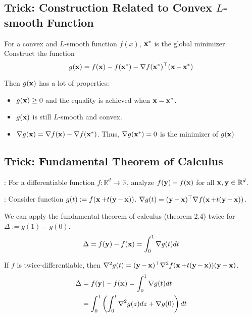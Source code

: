 \subsection*{Trick: Construction Related to Convex $L$-smooth Function}
For a convex and $L$-smooth function $f(x)$, $\x^*$ is the global minimizer. Construct the function
$$
g(\x) = f(\x) - f(\x^*) - \nabla f(\x^*)^\top(\x - \x^*)
$$

Then $g(\x)$ has a lot of properties:
\begin{itemize}[leftmargin=*]
    \item $g(\x) \geq 0$ and the equality is achieved when $\x = \x^*$.
    \item $g(\x)$ is still $L$-smooth and convex.
    \item $\nabla g(\x) = \nabla f(\x) - \nabla f(\x^*)$. Thus, $\nabla g(\x^*) = 0$ is the minimizer of $g(\x)$
\end{itemize}


\subsection*{Trick: Fundamental Theorem of Calculus}
: For a differentiable function $f: \mathbb{R}^d \rightarrow \mathbb{R}$, analyze $f(\y) - f(\x)$ for all $\x, \y \in \mathbb{R}^d$. 

: Consider function $g(t):=f(\x+t(\y-\x))$. $\nabla g(t)=(\y-\x)^{\top} \nabla f(\x+t(\y-\x))$.

We can apply the fundamental theorem of calculus (theorem 2.4) twice for $\Delta:=g(1)-g(0)$.
$$
\Delta =f(\y)-f(\x) =\int_{0}^{1} \nabla g(t) d t
$$

If $f$ is twice-differentiable, then $\nabla^{2} g(t)=(\y-\x)^{\top} \nabla^{2} f(\x+t(\y-\x))(\y-\x)$.
$$\begin{aligned} \Delta &=f(\y)-f(\x) =\int_{0}^{1} \nabla g(t) d t \\ &=\int_{0}^{1}\left(\int_{0}^{t} \nabla^{2} g(z) d z+\nabla g(0)\right) d t \end{aligned}$$